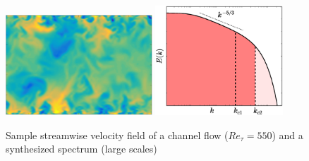 \documentclass{beamer}
\begin{document}
\begin{frame}
\begin{overprint}
\begin{figure}
		\includegraphics[height=3.75cm,valign=t]{./figures/turbulence/Ulargemid.png}
		\includegraphics[height=4.1cm,valign=t]{./figures/turbulence/turbulence_spectra_variousranges12.eps}
		\caption*{Sample streamwise velocity field of a channel flow ($ Re_\tau = 550$) and a synthesized spectrum (large scales)}
	\end{figure}		
	\end{overprint}
\end{frame}
\end{document}
